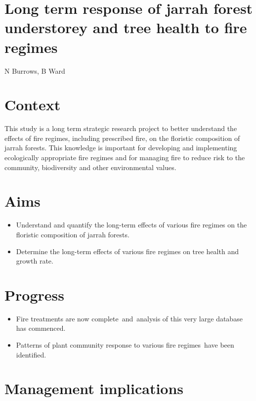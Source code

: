 \documentclass[version=last,
    paper=a4,                               %
    10pt,                                   %
    dvipsnames,
    oneside,                              %
    headings=openany,                       %
    open=any,
    BCOR=7mm,                               %
    DIV=15,     %
]{scrbook}
\begin{document}
\section*{Long term response of jarrah forest understorey and tree health to fire
regimes
}

N Burrows, B Ward



\section*{Context}

This study is a long term strategic research project to better
understand the effects of fire regimes, including prescribed fire, on
the floristic composition of jarrah forests. This knowledge is important
for developing and implementing ecologically appropriate fire regimes
and for managing fire to reduce risk to the community, biodiversity and
other environmental values.




\section*{Aims}

\begin{itemize}
\itemsep1pt\parskip0pt
\item
  Understand and quantify the long-term effects of various fire regimes
  on the floristic composition of jarrah forests.
\item
  Determine the long-term effects of various fire regimes on tree health
  and growth rate.
\end{itemize}




\section*{Progress}

\begin{itemize}
\itemsep1pt\parskip0pt
\item
  Fire treatments are now complete~and~analysis of this very large
  database has commenced.
\item
  Patterns of plant community response to various fire regimes~have been
  identified.
\end{itemize}




\section*{Management implications}
\end{document}
